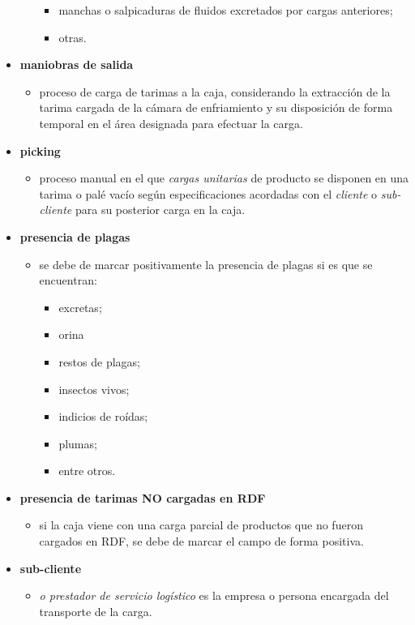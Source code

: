 \begin{itemize}
\begin{itemize}
\begin{itemize}
			\item manchas o salpicaduras de fluidos excretados por cargas anteriores;
			\item otras.
		\end{itemize}
	\end{itemize}
	\item \textbf{maniobras de salida}
	\begin{itemize}
		\item proceso de carga de tarimas a la caja, considerando la extracción de la tarima cargada de la cámara de enfriamiento y su disposición de forma temporal en el área designada para efectuar la carga.
	\end{itemize}
	\item \textbf{picking}
	\begin{itemize}
		\item proceso manual en el que \emph{cargas unitarias} de producto se disponen en una tarima o palé vacío según especificaciones acordadas con el \emph{cliente} o \emph{sub-cliente} para su posterior carga en la caja.
	\end{itemize}
	\item \textbf{presencia de plagas}
	\begin{itemize}
		\item se debe de marcar positivamente la presencia de plagas si es que se encuentran:
		\begin{itemize}
			\item excretas;
			\item orina
			\item restos de plagas;
			\item insectos vivos;
			\item indicios de roídas;
			\item plumas;
			\item entre otros.
		\end{itemize}
	\end{itemize}
	\item \textbf{presencia de tarimas NO cargadas en RDF}
	\begin{itemize}
		\item si la caja viene con una carga parcial de productos que no fueron cargados en RDF, se debe de marcar el campo de forma positiva.
	\end{itemize}
	\item \textbf{sub-cliente}
	\begin{itemize}
		\item \emph{o prestador de servicio logístico} es la empresa o persona encargada del transporte de la carga.

\end{itemize}
\end{itemize}
